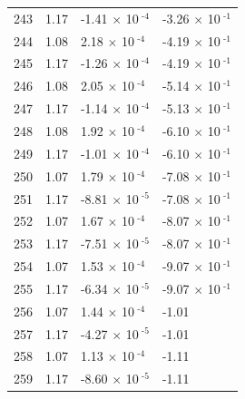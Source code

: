 \documentclass[a4paper,11pt]{article}
\begin{document}
\begin{center}
\begin{longtable}{|R{1.5cm}|R{2.5cm}|R{2.5cm}|R{2.5cm}|}
  243 &   1.17  &        -1.41 $\times$ 10$^{\text{          -4}}$  &        -3.26 $\times$ 10$^{\text{          -1}}$ \\ 
  244 &   1.08  &         2.18 $\times$ 10$^{\text{          -4}}$  &        -4.19 $\times$ 10$^{\text{          -1}}$ \\ 
  245 &   1.17  &        -1.26 $\times$ 10$^{\text{          -4}}$  &        -4.19 $\times$ 10$^{\text{          -1}}$ \\ 
  246 &   1.08  &         2.05 $\times$ 10$^{\text{          -4}}$  &        -5.14 $\times$ 10$^{\text{          -1}}$ \\ 
  247 &   1.17  &        -1.14 $\times$ 10$^{\text{          -4}}$  &        -5.13 $\times$ 10$^{\text{          -1}}$ \\ 
  248 &   1.08  &         1.92 $\times$ 10$^{\text{          -4}}$  &        -6.10 $\times$ 10$^{\text{          -1}}$ \\ 
  249 &   1.17  &        -1.01 $\times$ 10$^{\text{          -4}}$  &        -6.10 $\times$ 10$^{\text{          -1}}$ \\ 
  250 &   1.07  &         1.79 $\times$ 10$^{\text{          -4}}$  &        -7.08 $\times$ 10$^{\text{          -1}}$ \\ 
  251 &   1.17  &        -8.81 $\times$ 10$^{\text{          -5}}$  &        -7.08 $\times$ 10$^{\text{          -1}}$ \\ 
  252 &   1.07  &         1.67 $\times$ 10$^{\text{          -4}}$  &        -8.07 $\times$ 10$^{\text{          -1}}$ \\ 
  253 &   1.17  &        -7.51 $\times$ 10$^{\text{          -5}}$  &        -8.07 $\times$ 10$^{\text{          -1}}$ \\ 
  254 &   1.07  &         1.53 $\times$ 10$^{\text{          -4}}$  &        -9.07 $\times$ 10$^{\text{          -1}}$ \\ 
  255 &   1.17  &        -6.34 $\times$ 10$^{\text{          -5}}$  &        -9.07 $\times$ 10$^{\text{          -1}}$ \\ 
  256 &   1.07  &         1.44 $\times$ 10$^{\text{          -4}}$  &  -1.01 \\ 
  257 &   1.17  &        -4.27 $\times$ 10$^{\text{          -5}}$  &  -1.01 \\ 
  258 &   1.07  &         1.13 $\times$ 10$^{\text{          -4}}$  &  -1.11 \\ 
  259 &   1.17  &        -8.60 $\times$ 10$^{\text{          -5}}$  &  -1.11 \\ 

\end{longtable}
\end{center}
\end{document}
